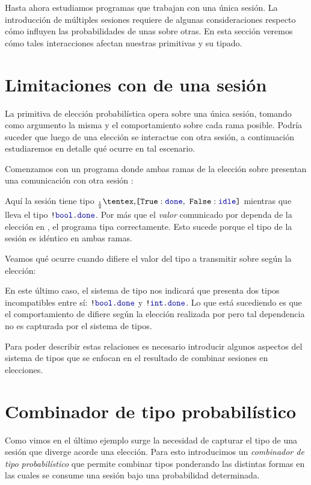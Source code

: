 Hasta ahora estudiamos programas que trabajan con una única sesión. La
introducción de múltiples sesiones requiere de algunas consideraciones respecto
cómo influyen las probabilidades de unas sobre otras. En esta sección veremos
cómo tales interacciones afectan nuestras primitivas y su tipado.

\section{Limitaciones con  de una sesión}

La primitiva de elección probabilística  opera sobre una única sesión,
tomando como argumento la misma y el comportamiento sobre cada rama posible.
Podría suceder que luego de una elección se interactue con otra sesión, a
continuación estudiaremos en detalle qué ocurre en tal escenario.

Comenzamos con un programa donde ambas ramas de la elección sobre 
presentan una comunicación con otra sesión :

\TwoSessionsPickBothBranches

Aquí la sesión  tiene tipo $\BinaryPChoice[\frac{1}{2}]{\Done}{\Idle}$
mientras que  lleva el tipo $\Out\tbool\Done$. Por más que el \emph{valor}
comunicado por  dependa de la elección en , el programa tipa
correctamente. Esto sucede porque el tipo de la sesión es idéntico en ambas
ramas.

Veamos qué ocurre cuando difiere el valor del tipo a transmitir sobre 
según la elección:

\TwoSessionsInvalidPickBothBranches

En este último caso, el sistema de tipo nos indicará que  presenta dos
tipos incompatibles entre sí: $\Out\tbool\Done$ y $\Out\tint\Done$. Lo que está
sucediendo es que el comportamiento de  difiere según la elección
realizada por  pero tal dependencia no es capturada por el sistema de
tipos.

Para poder describir estas relaciones es necesario introducir algunos aspectos
del sistema de tipos que se enfocan en el resultado de combinar sesiones en
elecciones.

\section{Combinador de tipo probabilístico}

Como vimos en el último ejemplo surge la necesidad de capturar el tipo de una
sesión que diverge acorde una elección. Para esto introducimos un
\emph{combinador de tipo probabilístico} que permite combinar tipos ponderando
las distintas formas en las cuales se consume una sesión bajo una probabilidad
determinada.


